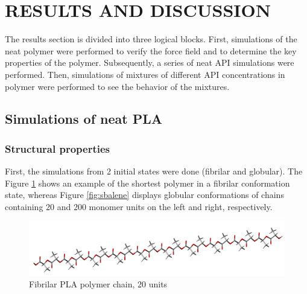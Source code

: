 \newpage
\section{RESULTS AND DISCUSSION}

The results section is divided into three logical blocks. First, simulations of the neat polymer were performed to verify the force field and to determine the key properties of the polymer. Subsequently, a series of neat API simulations were performed. Then, simulations of mixtures of different API concentrations in polymer were performed to see the behavior of the mixtures.  

\subsection{Simulations of neat PLA}
\subsubsection{Structural properties}
First, the simulations from 2 initial states were done (fibrilar and globular). The Figure \ref{fig:linearni} shows an example of the shortest polymer in a fibrilar conformation state, whereas Figure \ref{fig:sbalene} displays globular conformations of chains containing 20 and 200 monomer units on the left and right, respectively. 

\begin{figure}[htb]
	\centering
	\includegraphics[width=0.9\linewidth]{img/pla_10d_tube.png}
	\caption{Fibrilar PLA polymer chain, 20 units}
	\label{fig:linearni}
\end{figure}

